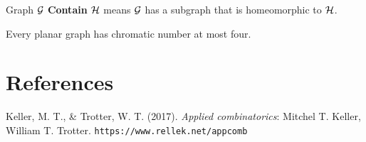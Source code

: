 \documentclass{article}
\begin{document}
			\begin{definition}
				Graph $\mathcal{{G}}$ \textbf{Contain} $\mathcal{{H}}$ means $\mathcal{{G}}$ has a subgraph that is homeomorphic to $\mathcal{{H}}$.
			\end{definition}
			
			\begin{theorem}
				Every planar graph has chromatic number at most four.
			\end{theorem}




	\newpage
	\section*{References}
		\par Keller, M. T., \& Trotter, W. T. (2017). \emph{Applied combinatorics}: Mitchel T. Keller, William T. Trotter. \texttt{https://www.rellek.net/appcomb}
\end{document}
